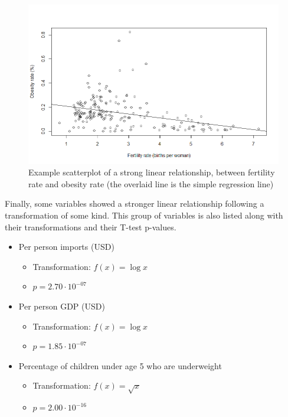 \documentclass[oneside,12pt]{report}
\begin{document}
\begin{figure}
\centering
\caption{Example scatterplot of a strong linear relationship, between fertility rate and obesity rate (the overlaid line is the simple regression line)}
\label{fig:fertility-obesity-scatter}
\includegraphics[width=\textwidth]{fertility-obesity-scatter.png}
\end{figure}

Finally, some variables showed a stronger linear relationship following a transformation of some kind. This group of variables is also listed along with their transformations and their T-test p-values.

\begin{itemize}
\item Per person imports (USD)
	\begin{itemize}
	\item Transformation: \begin{math}f(x) =\log{x}\end{math}
	\item \begin{math}p=2.70\cdot10^{-07}\end{math}
	\end{itemize}
\item Per person GDP (USD)
	\begin{itemize}
	\item Transformation: \begin{math}f(x) = \log{x}\end{math}
	\item \begin{math}p=1.85\cdot10^{-07}\end{math}
	\end{itemize}
\item Percentage of children under age 5 who are underweight
	\begin{itemize}
	\item Transformation: \begin{math}f(x) = \sqrt{x}\end{math}
	\item \begin{math}p=2.00\cdot10^{-16}\end{math}
	\end{itemize}
\end{itemize}
\end{document}
